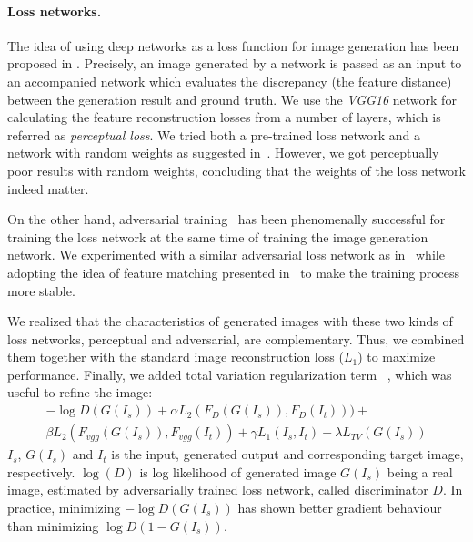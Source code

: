 \documentclass[10pt,twocolumn,letterpaper]{article}
\begin{document}
\paragraph{Loss networks.}
\label{sec:lossnet}
The idea of using deep networks as a loss function for image generation has been proposed in \cite{larsen_icml2016,ulyanov_icml2016,johnson_eccv2016}. Precisely, an image generated by a network is passed as an input to an accompanied network which evaluates the discrepancy (the feature distance) between the generation result and ground truth. We use the \textit{VGG16} network for calculating the feature reconstruction losses from a number of layers, which is referred as \emph{perceptual loss}.
%
We tried both a pre-trained loss network and a network with random weights as suggested in~\cite{he_nips2016,Ustyuzhaninov_arxiv2016}. However, we got perceptually poor results with random weights, concluding that the weights of the loss network indeed matter. 

On the other hand, adversarial training~\cite{Goodfellow_nips2014} has been phenomenally successful for training the loss network at the same time of training the image generation network. We experimented with a similar adversarial loss network as in~\cite{Radford_iclr2016} while adopting the idea of feature matching presented in~\cite{salimans_nips2016} to make the training process more stable.

We realized that the characteristics of generated images with these two kinds of loss networks, perceptual and adversarial, are complementary. Thus, we combined them together with the standard image reconstruction loss ($L_1$) to maximize performance. Finally, we added total variation regularization term ~\cite{johnson_eccv2016}, which was useful to refine the image:
\begin{multline}
-\log D(G(I_s)) + \alpha L_{2}(F_{D}(G(I_s)), F_{D}(I_t)) ) + \\
\beta L_{2}(F_{vgg}(G(I_s)), F_{vgg}(I_t)) + \gamma L_1(I_s,I_t) + \lambda L_{TV}(G(I_s))
\end{multline}
$I_s$, $G(I_s)$ and $I_t$ is the input, generated output and corresponding target image, respectively. $\log(D)$ is log likelihood of generated image $G(I_s)$ being a real image, estimated by adversarially trained loss network, called discriminator $D$. In practice, minimizing $-\log D(G(I_s))$ has shown better gradient behaviour than minimizing $\log D(1 - G(I_s))$.
\end{document}
